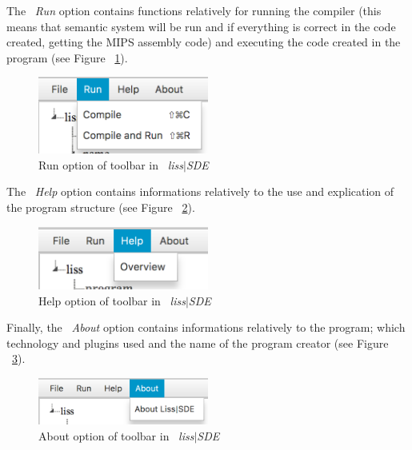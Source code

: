 \documentclass[
  oneside,
  11pt, a4paper,
  footinclude=true,
  headinclude=true,
  cleardoublepage=empty
]{scrbook}
\begin{document}
The ~\textit{Run} option contains functions relatively for running the compiler (this means that semantic system will be run and if everything is correct in the code created, getting the MIPS assembly code) and executing the code created in the program (see Figure ~\ref{fig:LISS-SDE_toolbar_3}).

\begin{figure}[h!]
  \centering
    \includegraphics[width=0.5\textwidth]{img/LISS-SDE_toolbar_menu/ToolBar_menu3.png}
    \caption{Run option of toolbar in ~\textit{liss$|$SDE}}
    \label{fig:LISS-SDE_toolbar_3}
\end{figure}

The ~\textit{Help} option contains informations relatively to the use and explication of the program structure (see Figure ~\ref{fig:LISS-SDE_toolbar_4}).

\begin{figure}[h!]
  \centering
    \includegraphics[width=0.5\textwidth]{img/LISS-SDE_toolbar_menu/ToolBar_menu4.png}
    \caption{Help option of toolbar in ~\textit{liss$|$SDE}}
    \label{fig:LISS-SDE_toolbar_4}
\end{figure}

Finally, the ~\textit{About} option contains informations relatively to the program; which technology and plugins used and the name of the program creator (see Figure ~\ref{fig:LISS-SDE_toolbar_5}).

\begin{figure}[h!]
  \centering
    \includegraphics[width=0.5\textwidth]{img/LISS-SDE_toolbar_menu/ToolBar_menu5.png}
    \caption{About option of toolbar in ~\textit{liss$|$SDE}}
    \label{fig:LISS-SDE_toolbar_5}
\end{figure}
\end{document}
